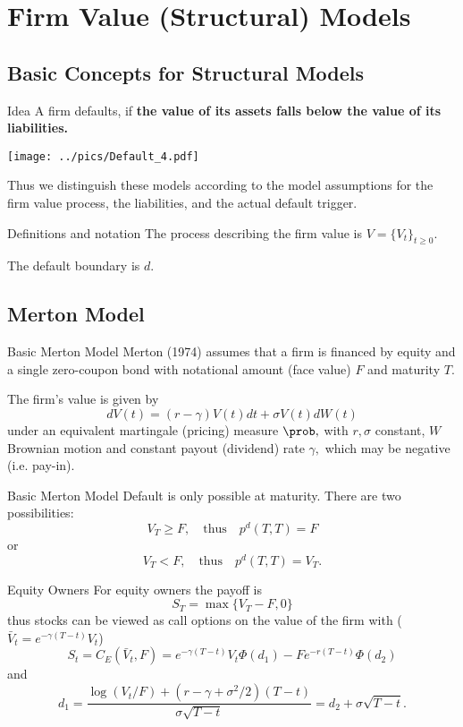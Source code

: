 \section{Firm Value (Structural) Models}
\subsection{Basic Concepts for Structural Models}

Idea
	A firm defaults, if \textbf{the value of its assets falls below the value of its liabilities.}
	
	\begin{center}\texttt{[image: ../pics/Default\_4.pdf]}\end{center}
	
	Thus we distinguish these models according to the model assumptions for the firm value process, the liabilities, and the actual default trigger. 


Definitions and notation
	The process describing the firm value is $V=\{V_t\}_{t\geq 0}$.

	The default boundary is $d$.
	

\subsection{Merton Model}

Basic Merton Model
	Merton (1974) assumes that a firm is financed by
	equity and a single zero-coupon bond with notational amount (face
	value) $F$ and maturity $T$.

	The firm's value is given by
	$$
	dV(t) = (r-\gamma) V(t)  dt + \sigma V(t) dW(t)
	$$
	under an equivalent martingale (pricing) measure $\prob,$ with $r,
	\sigma$ constant, $W$ Brownian motion and constant payout
	(dividend) rate $\gamma,$ which may be negative (i.e. pay-in).


Basic Merton Model
	Default is only possible at maturity. There are two possibilities:
	$$
	V_T \geq F, \quad \mbox{thus} \quad p^d(T,T)=F
	$$
	or
	$$
	V_T < F, \quad \mbox{thus} \quad p^d(T,T)=V_T.
	$$


Equity Owners
	For equity owners the payoff  is
		$$
		S_T=\max\{V_T-F,0\}
		$$
	thus stocks can be viewed as call options on the value of the firm
	with ($\bar{V}_t = e^{-\gamma(T-t)}V_t$)
		$$
		S_t=C_E(\bar{V}_t,F)=e^{-\gamma(T-t)}V_t\Phi(d_1)-Fe^{-r(T-t)}\Phi(d_2)
		$$
	and
		$$
		d_1=\frac{\log(V_t/F)+(r-\gamma+\sigma^2/2)(T-t)}{\sigma\sqrt{T-t}}=d_2+\sigma\sqrt{T-t}.
		$$


